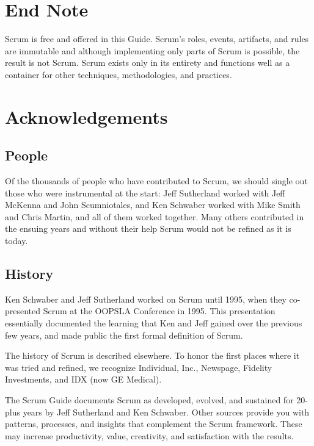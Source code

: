 \section{End Note}
Scrum is free and offered in this Guide. Scrum's roles, events, artifacts, and rules are immutable
and although implementing only parts of Scrum is possible, the result is not Scrum. Scrum exists
only in its entirety and functions well as a container for other techniques, methodologies, and
practices.

\section{Acknowledgements}

\subsection{People}
Of the thousands of people who have contributed to Scrum, we should single out those who
were instrumental at the start: Jeff Sutherland worked with Jeff McKenna and John
Scumniotales, and Ken Schwaber worked with Mike Smith and Chris Martin, and all of them
worked together. Many others contributed in the ensuing years and without their help Scrum
would not be refined as it is today.

\subsection{History}
Ken Schwaber and Jeff Sutherland worked on Scrum until 1995, when they co-presented Scrum
at the OOPSLA Conference in 1995. This presentation essentially documented the learning that
Ken and Jeff gained over the previous few years, and made public the first formal definition of
Scrum.

The history of Scrum is described elsewhere. To honor the first places where it was tried and
refined, we recognize Individual, Inc., Newspage, Fidelity Investments, and IDX (now GE
Medical).

The Scrum Guide documents Scrum as developed, evolved, and sustained for 20-plus years by
Jeff Sutherland and Ken Schwaber. Other sources provide you with patterns, processes, and
insights that complement the Scrum framework. These may increase productivity, value,
creativity, and satisfaction with the results.
